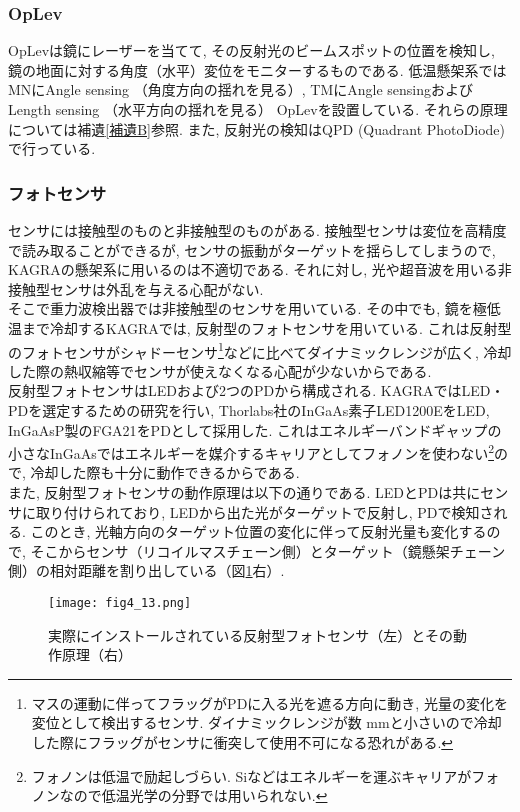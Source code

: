 \subsubsection{OpLev}
\label{sec4.2.2.1}
\vskip3mm
OpLevは鏡にレーザーを当てて, その反射光のビームスポットの位置を検知し, 鏡の地面に対する角度（水平）変位をモニターするものである. 低温懸架系ではMNにAngle sensing （角度方向の揺れを見る）, TMにAngle sensingおよびLength sensing （水平方向の揺れを見る） OpLevを設置している. それらの原理については補遺\ref{補遺B}参照. また, 反射光の検知はQPD (Quadrant PhotoDiode) で行っている. 
\subsubsection{フォトセンサ}
\label{sec4.2.2.2}
\vskip3mm
センサには接触型のものと非接触型のものがある. 接触型センサは変位を高精度で読み取ることができるが, センサの振動がターゲットを揺らしてしまうので, KAGRAの懸架系に用いるのは不適切である. それに対し, 光や超音波を用いる非接触型センサは外乱を与える心配がない. \\
\quad そこで重力波検出器では非接触型のセンサを用いている. その中でも, 鏡を極低温まで冷却するKAGRAでは, 反射型のフォトセンサを用いている. これは反射型のフォトセンサがシャドーセンサ\footnote{マスの運動に伴ってフラッグがPDに入る光を遮る方向に動き, 光量の変化を変位として検出するセンサ. ダイナミックレンジが数 mmと小さいので冷却した際にフラッグがセンサに衝突して使用不可になる恐れがある. }などに比べてダイナミックレンジが広く, 冷却した際の熱収縮等でセンサが使えなくなる心配が少ないからである. \\
\quad 反射型フォトセンサはLEDおよび2つのPDから構成される. KAGRAではLED・PDを選定するための研究\cite{44}を行い,  Thorlabs社のInGaAs素子LED1200E\cite{45}をLED, InGaAsP製のFGA21\cite{46}をPDとして採用した. これはエネルギーバンドギャップの小さなInGaAsではエネルギーを媒介するキャリアとしてフォノンを使わない\footnote{フォノンは低温で励起しづらい. Siなどはエネルギーを運ぶキャリアがフォノンなので低温光学の分野では用いられない. }ので, 冷却した際も十分に動作できるからである. \\
\quad また, 反射型フォトセンサの動作原理は以下の通りである. LEDとPDは共にセンサに取り付けられており, LEDから出た光がターゲットで反射し, PDで検知される. このとき, 光軸方向のターゲット位置の変化に伴って反射光量も変化するので, そこからセンサ（リコイルマスチェーン側）とターゲット（鏡懸架チェーン側）の相対距離を割り出している（図\ref{fig4.13}右）. 
\begin{figure}[H]
\begin{center}
\texttt{[image: fig4\_13.png]} 
\caption[反射型フォトセンサとその動作原理]{実際にインストールされている反射型フォトセンサ（左）\cite{47}とその動作原理（右）}
\label{fig4.13}
\end{center}
\end{figure}
